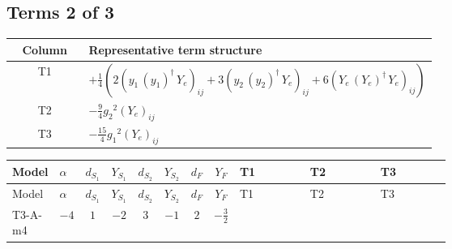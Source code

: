 \documentclass[8pt]{article}
\begin{document}
\begin{landscape}
\subsection*{Terms 2 of 3}
\begin{center}
\begin{tabular}{@{}c >{\raggedright\arraybackslash}p{0.82\linewidth}@{}}
\toprule
Column & Representative term structure \\
\midrule
T1 & \(\displaystyle +\frac{1}{4} (2 \left({y_1}\,\left({y_1}\right)^{\dagger}\,{Y_e}\right)_{ij}+3 \left({y_2}\,\left({y_2}\right)^{\dagger}\,{Y_e}\right)_{ij}+6 \left({Y_e}\,\left({Y_e}\right)^{\dagger}\,{Y_e}\right)_{ij})\) \\
\midrule
T2 & \(\displaystyle -\frac{9}{4} {g_2}^2 \left({Y_e}\right)_{ij}\) \\
\midrule
T3 & \(\displaystyle -\frac{15}{4} {g_1}^2 \left({Y_e}\right)_{ij}\) \\
\midrule
\bottomrule
\end{tabular}
\end{center}
\smallskip
\tiny
\begin{longtable}{@{}llcccccc >{\raggedright\arraybackslash}p{0.21\linewidth} >{\raggedright\arraybackslash}p{0.21\linewidth} >{\raggedright\arraybackslash}p{0.21\linewidth}@{}}
\toprule
Model & $\alpha$ & $d_{S_1}$ & $Y_{S_1}$ & $d_{S_2}$ & $Y_{S_2}$ & $d_F$ & $Y_F$ & T1 & T2 & T3 \\
\midrule
\endfirsthead
\toprule
Model & $\alpha$ & $d_{S_1}$ & $Y_{S_1}$ & $d_{S_2}$ & $Y_{S_2}$ & $d_F$ & $Y_F$ & T1 & T2 & T3 \\
\midrule
\endhead
T3-A-m4 & $-4$ & $1$ & $-2$ & $3$ & $-1$ & $2$ & $-\frac{3}{2}$ & \scriptsize\adjustbox{max width=\linewidth}{$\begin{gathered} +\frac{1}{4} (2 \left({y_1}\,\left({y_1}\right)^{\dagger}\,{Y_e}\right)_{ij}+3 \left({y_2}\,\left({y_2}\right)^{\dagger}\,{Y_e}\right)_{ij}+6 \left({Y_e}\,\left({Y_e}\right)^{\dagger}\,{Y_e}\right)_{ij})\end{gathered}$} & \scriptsize\adjustbox{max width=\linewidth}{$\begin{gathered} -\frac{9}{4} {g_2}^2 \left({Y_e}\right)_{ij}\end{gathered}$} & \scriptsize\adjustbox{max width=\linewidth}{$\begin{gathered} -\frac{15}{4} {g_1}^2 \left({Y_e}\right)_{ij}\end{gathered}$} \\
\midrule

\end{longtable}
\end{landscape}
\end{document}
